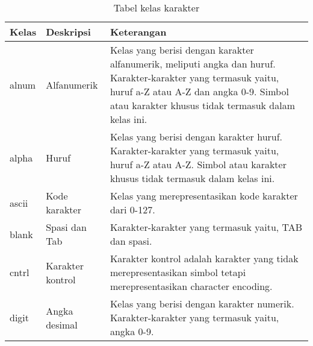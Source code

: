 \begin{table}[H]
	\caption {Tabel kelas karakter} \label{tab:character classes}
	\begin{center}
		\begin{tabular}{|p{2 cm}|>{\raggedright} p{5 cm}| p{7.5 cm}|}
		\hline
		Kelas & Deskripsi & Keterangan \\ 
		\hline 
		alnum & Alfanumerik & Kelas yang berisi dengan karakter alfanumerik, meliputi angka dan huruf. Karakter-karakter yang termasuk yaitu, huruf a-Z atau A-Z dan angka 0-9. Simbol atau karakter khusus tidak termasuk dalam kelas ini. \newline \\ 
		\hline 
		alpha & Huruf & Kelas yang berisi dengan karakter huruf. Karakter-karakter yang termasuk yaitu, huruf a-Z atau A-Z.	Simbol atau karakter khusus tidak termasuk dalam kelas ini. \newline \\ 
		\hline 
		ascii & Kode karakter & Kelas yang merepresentasikan kode karakter dari 0-127. \newline \\ 
		\hline 
		blank & Spasi dan Tab & Karakter-karakter yang termasuk yaitu, TAB dan spasi. \newline \\ 
		\hline 
		cntrl & Karakter kontrol & Karakter kontrol adalah karakter yang tidak merepresentasikan simbol tetapi merepresentasikan character encoding. \newline \\ 
		\hline 
		digit & Angka desimal & Kelas yang berisi dengan karakter numerik. Karakter-karakter yang termasuk yaitu, angka 0-9. \newline \\ 
		\hline 
		\end{tabular} 
	\end{center}
\end{table}


